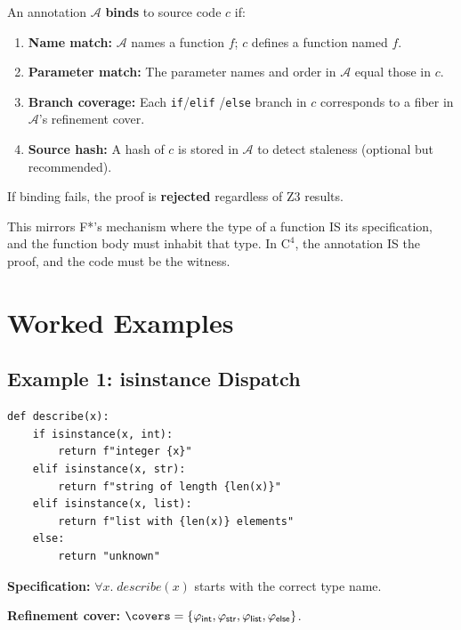 \begin{definition}
\label{def:binding}
An annotation $\mathcal{A}$ \textbf{binds} to source code $c$ if:
\begin{enumerate}
\item \textbf{Name match:} $\mathcal{A}$ names a function $f$;
  $c$ defines a function named $f$.
\item \textbf{Parameter match:} The parameter names and order in
  $\mathcal{A}$ equal those in $c$.
\item \textbf{Branch coverage:} Each \texttt{if}/\texttt{elif}
  /\texttt{else} branch in $c$ corresponds to a fiber in
  $\mathcal{A}$'s refinement cover.
\item \textbf{Source hash:} A hash of $c$ is stored in $\mathcal{A}$
  to detect staleness (optional but recommended).
\end{enumerate}
If binding fails, the proof is \textbf{rejected} regardless of
Z3 results.
\end{definition}

This mirrors F*'s mechanism where the type of a function IS
its specification, and the function body must inhabit that type.
In $\mathrm{C}^4$, the annotation IS the proof, and the code
must be the witness.


\section{Worked Examples}
\label{sec:worked-examples}


\subsection{Example 1: isinstance Dispatch}
\label{sec:ex-isinstance}

\begin{lstlisting}
def describe(x):
    if isinstance(x, int):
        return f"integer {x}"
    elif isinstance(x, str):
        return f"string of length {len(x)}"
    elif isinstance(x, list):
        return f"list with {len(x)} elements"
    else:
        return "unknown"
\end{lstlisting}

\textbf{Specification:} $\forall x.\; \mathit{describe}(x)$
starts with the correct type name.

\textbf{Refinement cover:}
$\covers = \{\varphi_\mathsf{int}, \varphi_\mathsf{str},
\varphi_\mathsf{list}, \varphi_\mathsf{else}\}$.

